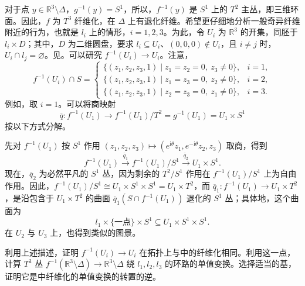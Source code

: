 \begin{construction}
对于点 $y\in\mathbb R^3\setminus\Delta$，$g^{-1}(y)=S^1$，所以，$f^{-1}(y)$ 是 $S^1$ 上的 $T^2$ 主丛，即三维环面。因此，$f$ 为 $T^3$ 纤维化，在 $\Delta$ 上有退化纤维。希望更仔细地分析一般奇异纤维附近的行为，也就是 $l_i$ 上的情形，$i=1,2,3$。为此，令 $U_i$ 为 $\mathbb R^3$ 的开集，同胚于 $l_i\times D$；其中，$D$ 为二维圆盘，要求 $l_i\subseteq U_i$、$(0,0,0)\notin U_i$，且 $i\ne j$ 时，$U_i\cap l_j=\varnothing$。见。可以研究 $f^{-1}(U_i)\to U_i$。注意，
\[
f^{-1}(U_i)\cap S=
\begin{cases}
\{(z_1,z_2,z_3,1)\mid z_1=z_2=0,\ z_3\ne0\},&i=1,\\
\{(z_1,z_2,z_3,1)\mid z_1=z_3=0,\ z_2\ne0\},&i=2,\\
\{(z_1,z_2,z_3,1)\mid z_2=z_3=0,\ z_1\ne0\},&i=3.
\end{cases}
\]
例如，取 $i=1$。可以将商映射
\[
\overline q\colon f^{-1}(U_1)\longrightarrow
f^{-1}(U_1)/T^2=g^{-1}(U_1)=U_1\times S^1
\]
按以下方式分解。
\begin{figure}[H]
\centering
{}
\BookNumberOnlyCaption\label{fig:6.9}
\end{figure}

先对 $f^{-1}(U_1)$ 按 $S^1$ 作用 $(z_1,z_2,z_3)\mapsto(e^{\mathrm i\theta}z_1,e^{-\mathrm i\theta}z_2,z_3)$ 取商，得到
\[
f^{-1}(U_1)\xrightarrow{\overline q_1}f^{-1}(U_1)/S^1
\xrightarrow{\overline q_2}U_1\times S^1.
\]
现在，$\overline q_2$ 为必然平凡的 $S^1$ 丛，因为剩余的 $T^2/S^1$ 作用在 $f^{-1}(U_1)/S^1$ 上为自由作用。因此，$f^{-1}(U_1)/S^1\cong U_1\times S^1\times S^1=U_1\times T^2$，而 $\overline q_1\colon f^{-1}(U_1)\to U_1\times T^2$，是沿包含于 $U_1\times T^2$ 的曲面 $\overline q_1(S\cap f^{-1}(U_1))$ 退化的 $S^1$ 丛；具体地，这个曲面为
\[
l_1\times\{\text{一点}\}\times S^1\subseteq U_1\times S^1\times S^1.
\]
在 $U_2$ 与 $U_3$ 上，也得到类似的图景。
\end{construction}

\begin{exercise}\label{exer:6.93}
利用上述描述，证明 $f^{-1}(U_i)\to U_i$ 在拓扑上与中的纤维化相同。利用这一点，计算 $T^3$ 丛 $f^{-1}(\mathbb R^3\setminus\Delta)\to\mathbb R^3\setminus\Delta$ 绕 $l_1,l_2,l_3$ 的环路的单值变换。选择适当的基，证明它是中纤维化的单值变换的转置的逆。
\end{exercise}


